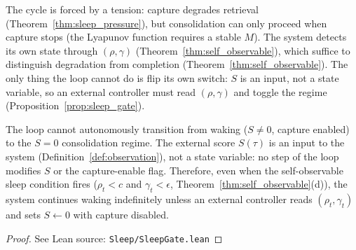 \begin{remark}
\label{rem:emergent_cycle}
\leanok
{}
The cycle is forced by a tension: capture degrades retrieval (Theorem~\ref{thm:sleep_pressure}), but consolidation can only proceed when capture stops (the Lyapunov function requires a stable $M$).  The system detects its own state through $(\rho, \gamma)$ (Theorem~\ref{thm:self_observable}), which suffice to distinguish degradation from
completion (Theorem~\ref{thm:self_observable}).  The only thing the loop cannot do is flip its own switch: $S$ is an input, not a state variable, so an external controller must read $(\rho, \gamma)$ and toggle the regime (Proposition~\ref{prop:sleep_gate}).
\end{remark}

\begin{proposition}
\label{prop:sleep_gate}
\leanok
{}
The loop cannot autonomously transition from waking ($S \neq 0$, capture enabled) to the $S = 0$ consolidation regime.  The external score $S(\tau)$ is an input to the system (Definition~\ref{def:observation}), not a state variable: no step of the loop modifies $S$ or the capture-enable flag.  Therefore, even when the self-observable sleep condition fires ($\rho_t < c$ and $\gamma_t < \epsilon$, Theorem~\ref{thm:self_observable}(d)), the system continues waking indefinitely unless an external controller reads $(\rho_t, \gamma_t)$ and sets $S \leftarrow 0$ with capture disabled.
\end{proposition}

\begin{proof}
\leanok
{}
See Lean source: \texttt{Sleep/SleepGate.lean}
\end{proof}

